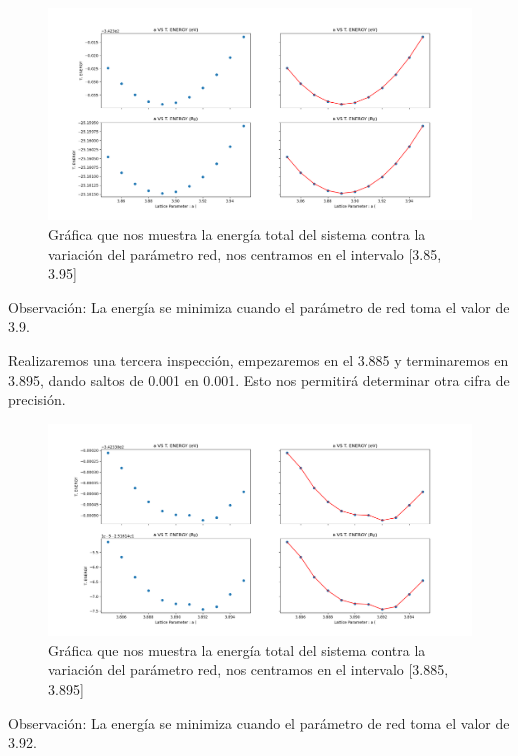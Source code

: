 \begin{figure}[H]
    \centering
    \includegraphics[scale=0.42]{images_silicano/Lattice_parameter_vs_Energy_second.png}
    \caption{Gráfica que nos muestra la energía total del sistema contra la variación del parámetro red, nos centramos en el intervalo [3.85, 3.95]}
\end{figure}

\noindent
Observación: La energía se minimiza cuando el parámetro de red toma el valor de 3.9.

\vspace{0.5cm}

Realizaremos una tercera inspección, empezaremos en el 3.885 y terminaremos en 3.895, dando saltos
de 0.001 en 0.001. Esto nos permitirá determinar otra cifra de precisión.

\begin{figure}[H]
    \centering
    \includegraphics[scale=0.42]{images_silicano/Lattice_parameter_vs_Energy_third.png}
    \caption{Gráfica que nos muestra la energía total del sistema contra la variación del parámetro red, nos centramos en el intervalo [3.885, 3.895]}
\end{figure}

\noindent
Observación: La energía se minimiza cuando el parámetro de red toma el valor de 3.92.

